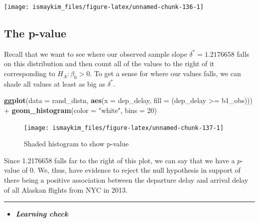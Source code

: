\documentclass[]{tufte-book}
\newenvironment{Shaded}{\begin{snugshade}}{\end{snugshade}}
\newcommand{\KeywordTok}[1]{\textcolor[rgb]{0.13,0.29,0.53}{\textbf{{#1}}}}
\newcommand{\DataTypeTok}[1]{\textcolor[rgb]{0.13,0.29,0.53}{{#1}}}
\newcommand{\DecValTok}[1]{\textcolor[rgb]{0.00,0.00,0.81}{{#1}}}
\newcommand{\StringTok}[1]{\textcolor[rgb]{0.31,0.60,0.02}{{#1}}}
\newcommand{\NormalTok}[1]{{#1}}
\let\oldrule=\rule
\renewcommand{\rule}[1]{\oldrule{\linewidth}}
\newenvironment{rmdblock}[1]
  {\begin{shaded*}
  \begin{itemize}
  \renewcommand{\labelitemi}{
    \raisebox{-.7\height}[0pt][0pt]{
    }
  }
  \item
  }
  {
  \end{itemize}
  \end{shaded*}
  }
\newenvironment{learncheck}
  {\begin{rmdblock}{warning}}
  {\end{rmdblock}}
\begin{document}
\begin{center}\texttt{[image: ismaykim\_files/figure-latex/unnamed-chunk-136-1]} \end{center}

\subsection{The p-value}\label{the-p-value-2}

Recall that we want to see where our observed sample slope
\(\delta^* = 1.2176658\) falls on this distribution and then count all
of the values to the right of it corresponding to \(H_A: \beta_0 > 0\).
To get a sense for where our values falls, we can shade all values at
least as big as \(\delta^*\).

\begin{Shaded}
\begin{Highlighting}[]
\KeywordTok{ggplot}\NormalTok{(}\DataTypeTok{data =} \NormalTok{rand_distn, }\KeywordTok{aes}\NormalTok{(}\DataTypeTok{x =} \NormalTok{dep_delay, }\DataTypeTok{fill =} \NormalTok{(dep_delay >=}\StringTok{ }\NormalTok{b1_obs))) +}
\StringTok{  }\KeywordTok{geom_histogram}\NormalTok{(}\DataTypeTok{color =} \StringTok{"white"}\NormalTok{, }\DataTypeTok{bins =} \DecValTok{20}\NormalTok{)}
\end{Highlighting}
\end{Shaded}

\begin{figure}

{\centering \texttt{[image: ismaykim\_files/figure-latex/unnamed-chunk-137-1]} 

}

\caption[Shaded histogram to show p-value]{Shaded histogram to show p-value}\label{fig:unnamed-chunk-137}
\end{figure}

Since 1.2176658 falls far to the right of this plot, we can say that we
have a \(p\)-value of 0. We, thus, have evidence to reject the null
hypothesis in support of there being a positive association between the
departure delay and arrival delay of all Alaskan flights from NYC in
2013.

\begin{center}\rule{0.5\linewidth}{\linethickness}\end{center}

\begin{learncheck}
\textbf{\emph{Learning check}}
\end{learncheck}
\end{document}
